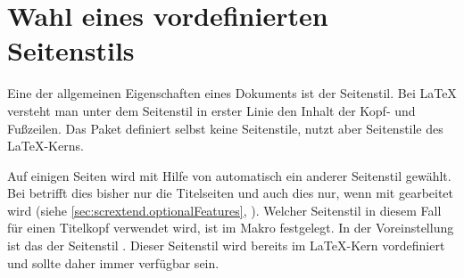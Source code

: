 


\section{Wahl eines vordefinierten Seitenstils}

Eine der allgemeinen Eigenschaften eines Dokuments ist der
Seitenstil. Bei {\LaTeX} versteht man unter dem
Seitenstil in erster Linie den Inhalt der Kopf- und Fußzeilen. Das Paket
 definiert selbst keine Seitenstile, nutzt aber
Seitenstile des \LaTeX-Kerns.


\begin{Declaration}
\end{Declaration}%
%
Auf einigen Seiten wird mit Hilfe von
 automatisch ein
anderer Seitenstil gewählt. Bei  betrifft dies bisher nur
die Titelseiten und auch dies nur, wenn mit
 gearbeitet wird (siehe
\autoref{sec:scrextend.optionalFeatures},
). Welcher Seitenstil in diesem
Fall für einen
Titelkopf%
 verwendet wird,
ist im Makro  festgelegt. In der Voreinstellung ist das
der Seitenstil . Dieser
Seitenstil wird bereits im \LaTeX-Kern vordefiniert und sollte daher immer
verfügbar sein.%
\EndIndexGroup





%
\EndIndexGroup

\endinput

